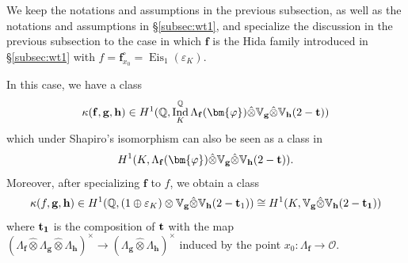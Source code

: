 \documentclass[a4paper,11pt]{amsart}
\theoremstyle{plain}
\theoremstyle{definition}
\theoremstyle{remark}
\newcommand{\bb}{\mathbb}
\newcommand{\cl}{\mathcal}
\DeclareMathOperator{\Ind}{Ind}
\DeclareMathOperator{\Eis}{Eis}
\newcommand{\hf}{{\mathbf{f}}}
\newcommand{\hg}{{\mathbf{g}}}
\newcommand{\hh}{{\mathbf h}}
\numberwithin{equation}{section}
\begin{document}

We keep the notations and assumptions in the previous subsection, as well as the notations and assumptions in \S\ref{subsec:wt1}, and specialize the discussion in the previous subsection to the case in which $\hf$ is the Hida family introduced in \S\ref{subsec:wt1} with $f=\hf_{x_0}^\circ=\Eis_1(\varepsilon_K)$.

In this case, we have a class
\[
\kappa(\hf,\hg,\hh)\in H^1(\mathbb Q, \Ind_K^{\mathbb Q} \Lambda_{\hf}(\bm{\varphi}) \hat \otimes \mathbb V_{\hg} \hat \otimes \mathbb V_{\hh}(2-{\bf t}))
\]
which under Shapiro's isomorphism can also be seen as a class in
\[
H^1(K,\Lambda_\hf(\bm{\varphi})\hat{\otimes}\mathbb V_{\hg} \hat \otimes \mathbb V_{\hh}(2-\bf{t})).
\]
Moreover, after specializing $\hf$ to $f$, we obtain a class
\begin{align*}
    \kappa(f,\hg,\hh)\in H^1(\bb{Q}, (1\oplus\varepsilon_K)\otimes \bb{V}_\hg \hat{\otimes} \bb{V}_\hh (2-\mathbf{t}_1))\cong H^1(K,\bb{V}_\hg\hat{\otimes} \bb{V}_\hh(2-\bf{t}_1))
\end{align*}
where $\bf{t}_1$ is the composition of $\bf{t}$ with the map $(\Lambda_{\hf}\hat{\otimes}\Lambda_{\hg}\hat{\otimes}\Lambda_\hh)^\times\rightarrow(\Lambda_{\hg}\hat{\otimes}\Lambda_\hh)^\times$ induced by the point $x_0:\Lambda_\hf\rightarrow \cl{O}$.
\end{document}

